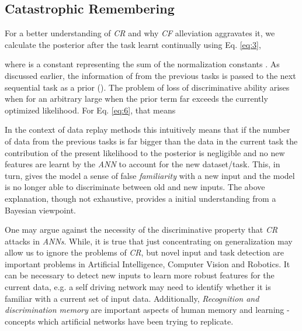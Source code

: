 \documentclass{article}
\begin{document}
\iffalse Assuming, we have access to previous data in some way as well as \textit{well distributed, well separated} independent parameters, we could, in theory, deal with the problem of \textit{catastrophic forgetting} because, for  tasks, Eq. \eqref{eq:3} will be reduced to,

Assuming the value of  to be equivalent to some constant value, we ignore it in \eqref{eq:5}. Practically, the scenario presented by \eqref{eq:4},\eqref{eq:5} is clearly not possible but it does provide us with an understanding of an ideal \textit{CF} alleviation scenario.
\fi


\subsection{Catastrophic Remembering}\label{cr}




For a better understanding of \textit{CR} and why \textit{CF} alleviation aggravates it, we calculate the posterior after the  task learnt continually using Eq. \eqref{eq:3},

where  is a constant representing the sum of the normalization constants . As discussed earlier, the information of from the previous tasks is passed to the next sequential task as a prior (). The problem of loss of discriminative ability arises when for an arbitrary large  when the prior term far exceeds the currently optimized likelihood. For Eq. \eqref{eq:6}, that means

In the context of data replay methods this intuitively means that if the number of data from the previous tasks  is far bigger than the data in the current task 
the contribution of the present likelihood to the posterior is negligible and no new features are learnt by the \textit{ANN} to account for the new dataset/task. 
This, in turn, gives the model a sense of false \textit{familiarity} with a new input and the model is no longer able to discriminate between old and new inputs. 
The above explanation, though not exhaustive, provides a initial understanding from a Bayesian viewpoint. 

One may argue against the necessity of the discriminative property that \textit{CR} attacks in \textit{ANNs}. While, it is true that just concentrating on generalization may allow us to ignore the problems of \textit{CR}, but novel input and task detection
are important problems in Artificial Intelligence, Computer Vision and Robotics.
It can be necessary to detect new inputs to learn more robust features for the current data, e.g. a self driving network may need to identify whether it is familiar with a current set of input data. 
Additionally, \textit{Recognition and discrimination memory} are important aspects of human memory and learning - concepts which artificial networks have been trying to replicate. 
\end{document}
